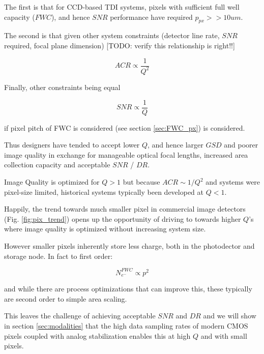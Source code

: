 \documentclass[10pt,journal]{IEEEtran}  %
\begin{document}
The first is that for CCD-based TDI systems, pixels with sufficient full well capacity ($FWC$), and hence $SNR$ performance have required $p_{px} >> 10um$.

The second is that given other system constraints (detector line rate, $SNR$ required, focal plane dimension) [TODO: verify this relationship is right!!]

\begin{equation}
    ACR \propto \frac{1}{Q^2}
\end{equation}

Finally, other constraints being equal

\begin{equation}
    SNR \propto \frac{1}{Q}
\end{equation}

if pixel pitch of FWC is considered (see section \ref{sec:FWC_px}) is considered.

Thus designers have tended to accept lower $Q$, and hence larger $GSD$ and poorer image quality in exchange for manageable optical focal lengths, increased area collection capacity and acceptable $SNR$ / $DR$.

\begin{observation}[$Q > 1$]
Image Quality is optimized for $Q>1$ but because $ACR \sim 1/Q^2$ and systems were pixel-size limited, historical systems typically been developed at $Q<1$.
\end{observation}

Happily, the trend towards much smaller pixel in commercial image detectors (Fig. \ref{fig:pix_trend}) opens up the opportunity of driving to towards higher $Q$'s where image quality is optimized without increasing system size.

However smaller pixels inherently store less charge, both in the photodector and storage node. In fact to first order\cite{jerram}:

\begin{equation}
  \label{eq:pix_fwc_scaling}  
N_{e^-}^{FWC} \propto p^2
\end{equation}

and while there are process optimizations that can improve this, these typically are second order to simple area scaling.

This leaves the challenge of achieving acceptable $SNR$ and $DR$ and we will show in section \ref{sec:modalities} that the high data sampling rates of modern CMOS pixels coupled with analog stabilization enables this at high $Q$ and with small pixels.
\end{document}
